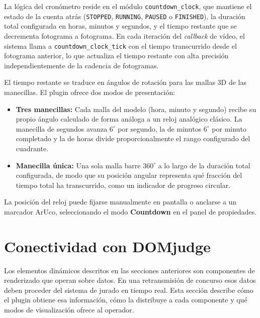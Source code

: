 La lógica del cronómetro reside en el módulo \texttt{countdown\_clock}, que mantiene el estado
de la cuenta atrás (\texttt{STOPPED}, \texttt{RUNNING}, \texttt{PAUSED} o \texttt{FINISHED}),
la duración total configurada en horas, minutos y segundos, y el tiempo restante que se
decrementa fotograma a fotograma. En cada iteración del \textit{callback} de vídeo, el sistema llama a
\texttt{countdown\_clock\_tick} con el tiempo transcurrido desde el fotograma anterior, lo que
actualiza el tiempo restante con alta precisión independientemente de la cadencia de fotogramas.
 
El tiempo restante se traduce en ángulos de rotación para las mallas 3D de las manecillas. El
plugin ofrece dos modos de presentación:
 
\begin{itemize}
    \item \textbf{Tres manecillas:} Cada malla del modelo (hora, minuto y segundo) recibe su
    propio ángulo calculado de forma análoga a un reloj analógico clásico. La manecilla de
    segundos avanza $6^\circ$ por segundo, la de minutos $6^\circ$ por minuto completado y la
    de horas divide proporcionalmente el rango configurado del cuadrante.
    \item \textbf{Manecilla única:} Una sola malla barre $360^\circ$ a lo largo de la duración
    total configurada, de modo que su posición angular representa qué fracción del tiempo total
    ha transcurrido, como un indicador de progreso circular.
\end{itemize}
 
La posición del reloj puede fijarse manualmente en pantalla o anclarse a un marcador ArUco,
seleccionando el modo \textbf{Countdown} en el panel de propiedades.
 
 
\section{Conectividad con DOMjudge}
\label{sec:domjudge_integracion}
 
Los elementos dinámicos descritos en las secciones anteriores son componentes de renderizado que
operan sobre datos. En una retransmisión de concurso esos datos deben proceder del sistema de
jurado en tiempo real. Esta sección describe cómo el plugin obtiene esa información, cómo la
distribuye a cada componente y qué modos de visualización ofrece al operador.
 
